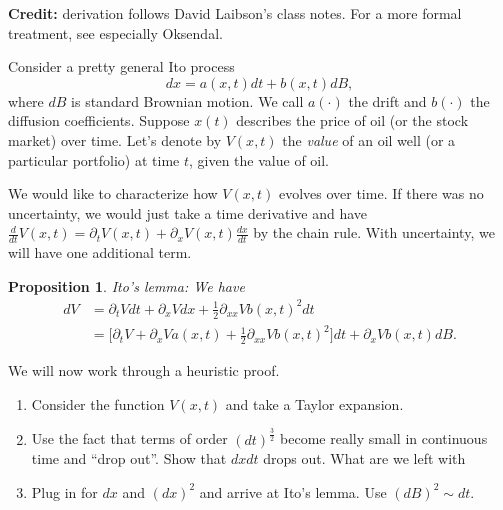 \documentclass[11pt]{extarticle}
\theoremstyle{plain}
\newtheorem{prop}[thm]{Proposition}
\theoremstyle{definition}
\begin{document}
\textbf{Credit:} derivation follows David Laibson's class notes. For a more formal treatment, see especially Oksendal. 

\vspace{5mm}
\noindent
Consider a pretty general Ito process
\begin{equation*}
	dx = a(x, t) dt + b(x, t) dB,
\end{equation*}
where $dB$ is standard Brownian motion. We call $a(\cdot)$ the drift and $b(\cdot)$ the diffusion coefficients. Suppose $x(t)$ describes the price of oil (or the stock market) over time. Let's denote by $V(x, t)$ the \textit{value} of an oil well (or a particular portfolio) at time $t$, given the value of oil. 

We would like to characterize how $V(x, t)$ evolves over time. If there was no uncertainty, we would just take a time derivative and have $\frac{d}{dt} V(x, t) = \partial_t V(x, t) + \partial_x V(x, t) \frac{dx}{dt}$ by the chain rule. With uncertainty, we will have one additional term. 

\begin{prop}
	Ito's lemma: We have 
	\begin{align*}
		dV &= \partial_t V dt + \partial_x V dx + \frac{1}{2} \partial_{xx} V b(x, t)^2 dt \\
		&= \bigg[ \partial_t V + \partial_x V a(x, t) + \frac{1}{2} \partial_{xx} V b(x, t)^2\bigg] dt + \partial_x V b(x, t) dB.
	\end{align*}
\end{prop}

\vspace{5mm}
\noindent
We will now work through a heuristic proof.
\begin{enumerate}
\item Consider the function $V(x, t)$ and take a Taylor expansion.

\item Use the fact that terms of order $(dt)^\frac{3}{2}$ become really small in continuous time and ``drop out''. Show that $dx dt$ drops out. What are we left with

\item Plug in for $dx$ and $(dx)^2$ and arrive at Ito's lemma. Use $(dB)^2 \sim dt$.

\end{enumerate}




\vspace{10mm}
\end{document}
